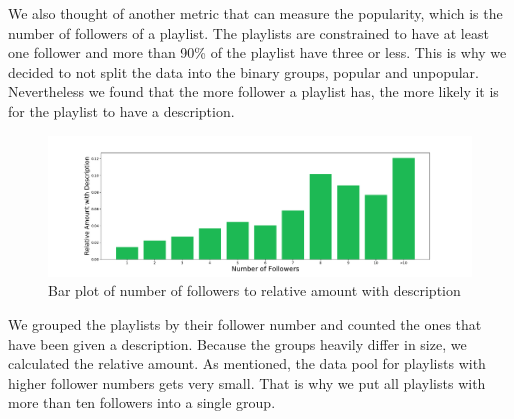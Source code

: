 We also thought of another metric that can measure the popularity, which is the number of followers of a playlist. The playlists are constrained to have at least one follower and more than 90\% of the playlist have three or less. This is why we decided to not split the data into the binary groups, popular and unpopular. Nevertheless we found that the more follower a playlist has, the more likely it is for the playlist to have a description.

\begin{figure}[ht]
    \centering
    \includegraphics[width=\textwidth]{fig/followers_to_description.pdf}
    \caption{Bar plot of number of followers to relative amount with description}
    \label{fig:followers_to_description}
\end{figure}

We grouped the playlists by their follower number and counted the ones that have been given a description. Because the groups heavily differ in size, we calculated the relative amount. As mentioned, the data pool for playlists with higher follower numbers gets very small. That is why we put all playlists with more than ten followers into a single group.